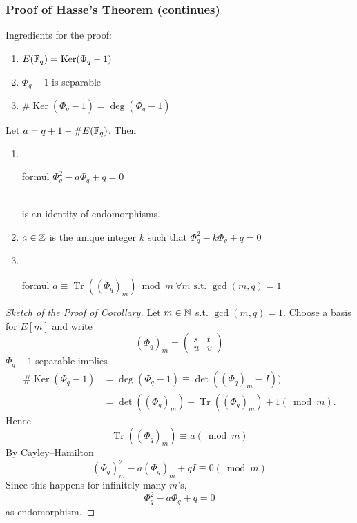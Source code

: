 \documentclass[10pt,handout]{beamer} %
\begin{document}
\begin{frame}
\frametitle{Proof of Hasse's Theorem (continues)}

\begin{beamerboxesrounded}[upper=block title example,lower=block body alerted,shadow=true]
{Ingredients for the proof:}\pause
\begin{enumerate}[<+-|alert@+>]
             \item $E(\mathbb F_q)=\operatorname{Ker}(\Phi_q-1)$
             \item $\Phi_q-1$ is separable
             \item $\#\operatorname{Ker}(\Phi_q-1)=\deg(\Phi_q-1)$
           \end{enumerate}
\end{beamerboxesrounded}\pause

\begin{corollary} Let $a=q+1-\#E(\mathbb F_q)$. Then
\begin{enumerate}[<+-|alert@+>]
             \item\
{\begin{beamercolorbox}[vmode,rounded=true,shadow=true,wd=3.2cm,center]{formul}
$\Phi_q^2-a\Phi_q+q=0$\end{beamercolorbox}}\\
\hfill is an identity of endomorphisms.
\item

$a\in\mathbb Z$ is the unique integer $k$ such that $\Phi_q^2-k\Phi_q+q=0$
\item\
{\begin{beamercolorbox}[rounded=true,shadow=true,wd=7cm,center]{formul}
$a\equiv\operatorname{Tr}((\Phi_q)_m)\bmod m\ \forall m\text{ s.t. }\gcd(m,q)=1$\end{beamercolorbox}}
\end{enumerate}
\end{corollary}
\end{frame}

\begin{frame}
\begin{proof}[Sketch of the Proof of Corollary]
Let $m\in\mathbb N$ s.t. $\gcd(m,q)=1$. Choose a basis for $E[m]$ and write
\alert{$$(\Phi_q)_m=\begin{pmatrix}s&t\\u&v\end{pmatrix}$$}\pause
$\Phi_q-1$ separable implies
\alert{
\begin{align*}
\#\operatorname{Ker}(\Phi_q-1)&=\deg(\Phi_q-1)\equiv\det((\Phi_q)_m-I))\\
                               &=\det((\Phi_q)_m)-\operatorname{Tr}((\Phi_q)_m)+1 (\bmod m).
\end{align*}
}\pause
Hence
\alert{$$\operatorname{Tr}((\Phi_q)_m)\equiv a(\bmod m)$$}\pause
By Cayley--Hamilton
\alert{$$(\Phi_q)_m^2-a(\Phi_q)_m+qI\equiv0(\bmod m)$$}\pause
Since this happens for infinitely many $m$'s,
\alert{$$\Phi_q^2-a\Phi_q+q=0$$}as endomorphism.\pause \end{proof}
\end{frame}
\end{document}
